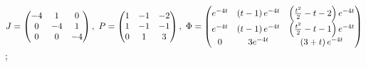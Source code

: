 \begin{enumsolsfull}
		\item \( J = \begin{pmatrix} -4 & 1 & 0 \\ 0 & -4 & 1 \\ 0 & 0 & -4 \end{pmatrix}, ~ P = \begin{pmatrix} 1 & -1 & -2 \\ 1 & -1 & -1 \\ 0 & 1 & 3 \end{pmatrix}, ~ \Phi = \begin{pmatrix} e^{-4t} & \left( t - 1 \right) e^{-4t} & \left( \frac{t^2}{2} - t - 2 \right) e^{-4t} \\ e^{-4t} & \left( t - 1 \right) e^{-4t} & \left( \frac{t^2}{2} - t - 1 \right) e^{-4t} \\ 0 & 3 e^{-4t} & \left( 3 + t \right) e^{-4t} \end{pmatrix} \); %

\end{enumsolsfull}
